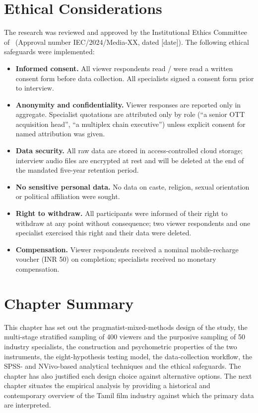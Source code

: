 \section{Ethical Considerations}
\label{sec:ethics}

The research was reviewed and approved by the Institutional Ethics
Committee of \institution\ (Approval number IEC/2024/Media-XX, dated
[date]).  The following ethical safeguards were implemented:

\begin{itemize}[itemsep=2pt]
\item \textbf{Informed consent.}  All viewer respondents read /
      were read a written consent form before data collection.
      All specialists signed a consent form prior to interview.
\item \textbf{Anonymity and confidentiality.}  Viewer responses
      are reported only in aggregate.  Specialist quotations are
      attributed only by role (``a senior OTT acquisition head'',
      ``a multiplex chain executive'') unless explicit consent for
      named attribution was given.
\item \textbf{Data security.}  All raw data are stored in
      access-controlled cloud storage; interview audio files are
      encrypted at rest and will be deleted at the end of the
      mandated five-year retention period.
\item \textbf{No sensitive personal data.}  No data on caste,
      religion, sexual orientation or political affiliation were
      sought.
\item \textbf{Right to withdraw.}  All participants were informed
      of their right to withdraw at any point without consequence;
      two viewer respondents and one specialist exercised this
      right and their data were deleted.
\item \textbf{Compensation.}  Viewer respondents received a
      nominal mobile-recharge voucher (INR 50) on completion;
      specialists received no monetary compensation.
\end{itemize}

\section{Chapter Summary}
\label{sec:meth_summary}

This chapter has set out the pragmatist-mixed-methods design of the
study, the multi-stage stratified sampling of 400 viewers and the
purposive sampling of 50 industry specialists, the construction and
psychometric properties of the two instruments, the eight-hypothesis
testing model, the data-collection workflow, the SPSS- and
NVivo-based analytical techniques and the ethical safeguards.  The
chapter has also justified each design choice against alternative
options.  The next chapter situates the empirical analysis by
providing a historical and contemporary overview of the Tamil film
industry against which the primary data are interpreted.
